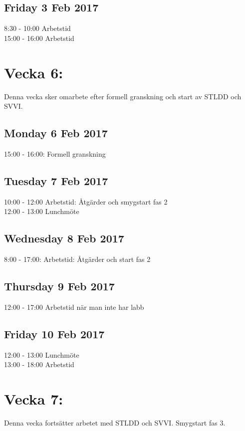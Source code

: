 \documentclass[paper=a4, fontsize=11pt,twoside]{article}
\begin{document}
\subsection*{Friday 3 Feb 2017}
	8:30 - 10:00 Arbetstid\\
	15:00 - 16:00 Arbetstid\\



\section*{Vecka 6:}
Denna vecka sker omarbete efter formell granskning och start av STLDD och
SVVI.\\
 \subsection*{Monday 6 Feb 2017}
	15:00 - 16:00: Formell granskning\\
\subsection*{Tuesday 7 Feb 2017}
	10:00 - 12:00 Arbetstid: Åtgärder och smygstart fas 2\\
	12:00 - 13:00 Lunchmöte\\
\subsection*{Wednesday 8 Feb 2017}
	8:00 - 17:00: Arbetstid: Åtgärder och start fas 2\\
\subsection*{Thursday 9 Feb 2017}
	12:00 - 17:00 Arbetstid när man inte har labb\\
\subsection*{Friday 10 Feb 2017}
	12:00 - 13:00 Lunchmöte\\
	13:00 - 18:00 Arbetstid\\




\section*{Vecka 7:}
Denna vecka fortsätter arbetet med STLDD och SVVI. Smygstart fas 3.\\
\end{document}
